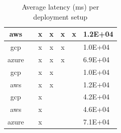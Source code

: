 \documentclass[11pt]{article}
\begin{document}
\begin{table}[!ht]
\begin{tabular}{|c|l|c|l|l|l|l|}
    aws               &                                    & x                     & \multicolumn{1}{c|}{x}                  & \multicolumn{1}{c|}{x}                   & \multicolumn{1}{c|}{x}               & 1.2E+04                                    \\ \hline
    gcp               &                                    & x                     & \multicolumn{1}{c|}{x}                  & \multicolumn{1}{c|}{x}                   &                                      & 1.0E+04                                    \\ \hline
    azure             &                                    & x                     & \multicolumn{1}{c|}{x}                  & \multicolumn{1}{c|}{x}                   &                                      & 6.9E+04                                    \\ \hline
    gcp               &                                    & x                     & \multicolumn{1}{c|}{x}                  &                                          &                                      & 1.0E+04                                    \\ \hline
    aws               &                                    & x                     & \multicolumn{1}{c|}{x}                  &                                          &                                      & 1.2E+04                                    \\ \hline
    gcp               &                                    & x                     &                                         &                                          &                                      & 4.2E+04                                    \\ \hline
    aws               &                                    & x                     &                                         &                                          &                                      & 4.6E+04                                    \\ \hline
    azure             &                                    & x                     &                                         &                                          &                                      & 7.1E+04                                    \\ \hline
    \end{tabular}
    \caption{Average latency (ms) per deployment setup}
    \label{tab:bench_vulas_latency}
    \vspace{-3mm}
\end{table}
\end{document}
